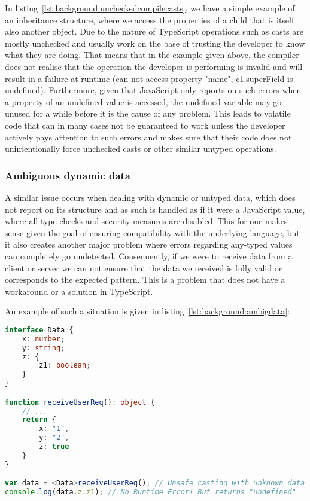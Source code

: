 In listing~\ref{lst:background:uncheckedcompilecasts}, we have a simple example of an inheritance structure, where we access the properties of a child that is itself also another object. Due to the nature of TypeScript operations such as casts are mostly unchecked and usually work on the base of trusting the developer to know what they are doing. That means that in the example given above, the compiler does not realise that the operation the developer is performing is invalid and will result in a failure at runtime (can not access property "name", c1.superField is undefined). Furthermore, given that JavaScript only reports on such errors when a property of an undefined value is accessed, the undefined variable may go unused for a while before it is the cause of any problem. This leads to volatile code that can in many cases not be guaranteed to work unless the developer actively pays attention to such errors and makes sure that their code does not unintentionally force unchecked casts or other similar untyped operations.

\subsubsection{Ambiguous dynamic data}

A similar issue occurs when dealing with dynamic or untyped data, which does not report on its structure and as such is handled as if it were a JavaScript value, where all type checks and security measures are disabled. This for one makes sense given the goal of ensuring compatibility with the underlying language, but it also creates another major problem where errors regarding any-typed values can completely go undetected. Consequently, if we were to receive data from a client or server we can not ensure that the data we received is fully valid or corresponds to the expected pattern. This is a problem that does not have a workaround or a solution in TypeScript.

An example of such a situation is given in listing~\ref{lst:background:ambigdata}:

\begin{lstlisting}[language=TypeScript,caption=Ambiguous dynamic data in TypeScript,label=lst:background:ambigdata]
interface Data {
	x: number;
	y: string;
	z: {
		z1: boolean;
	}
}

function receiveUserReq(): object {
	// ...
	return {
		x: "1",
		y: "2",
		z: true
	}
}

var data = <Data>receiveUserReq(); // Unsafe casting with unknown data
console.log(data.z.z1); // No Runtime Error! But returns "undefined"
\end{lstlisting}

